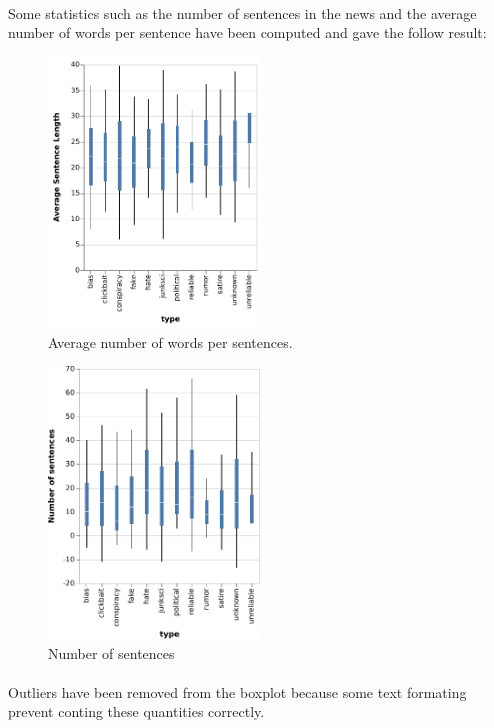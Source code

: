 \documentclass[11pt,a4paper,oneside]{report}
\begin{document}
\paragraph{} Some statistics such as the number of sentences in the news and the average number of words per sentence have been computed and gave the follow result:
\begin{figure}[h]
	\centering
	\includegraphics[width=0.5\textwidth]{plot2.pdf}
	\caption{Average number of words per sentences.}
	\label{plot:plot2}
\end{figure}
\begin{figure}[h]
	\centering
	\includegraphics[width=0.5\textwidth]{plot3.pdf}
	\caption{Number of sentences}
	\label{plot:plot3}
\end{figure}
\paragraph{}
Outliers have been removed from the boxplot because some text formating prevent conting these quantities correctly. 
\end{document}
